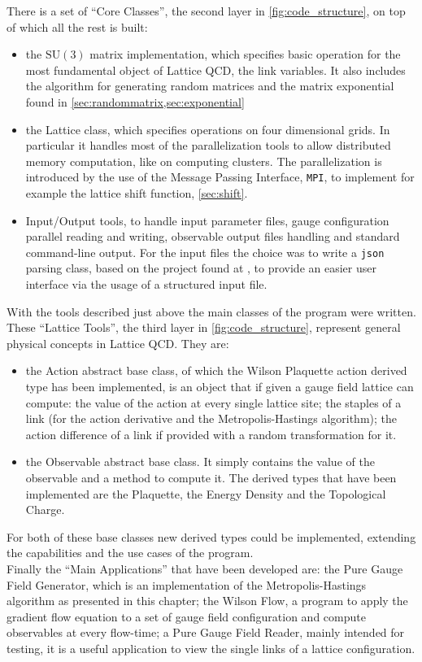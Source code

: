 
There is a set of ``Core Classes'', the second layer in \cref{fig:code_structure}, on top of which all the rest is built:
\begin{itemize} 
    \item the $\mathrm{SU}(3)$ matrix implementation, which specifies basic operation for the most fundamental object of Lattice QCD, the link variables. It also includes the algorithm for generating random matrices and the matrix exponential found in \cref{sec:randommatrix,sec:exponential} 
    \item the Lattice class, which specifies operations on four dimensional grids. In particular it handles most of the parallelization tools to allow distributed memory computation, like on computing clusters. The parallelization is introduced by the use of the Message Passing Interface, \texttt{MPI}, to implement for example the lattice shift function, \cref{sec:shift}.
    \item Input/Output tools, to handle input parameter files, gauge configuration parallel reading and writing, observable output files handling and standard command-line output. For the input files the choice was to write a \texttt{json} parsing class, based on the project found at \cite{_nlohmann/json}, to provide an easier user interface via the usage of a  structured input file.
\end{itemize}

With the tools described just above the main classes of the program were written. These ``Lattice Tools'', the third layer in \cref{fig:code_structure}, represent general physical concepts in Lattice QCD. They are:
\begin{itemize}
    \item the Action abstract base class, of which the Wilson Plaquette action derived type has been implemented, is an object that if given a gauge field lattice can compute: the value of the action at every single lattice site; the staples of a link (for the action derivative and the Metropolis-Hastings algorithm); the action difference of a link if provided with a random transformation for it.
    \item the Observable abstract base class. It simply contains the value of the observable and a method to compute it. The derived types that have been implemented are the Plaquette, the Energy Density and the Topological Charge.  
\end{itemize}
For both of these base classes new derived types could be implemented, extending the capabilities and the use cases of the program. \\
Finally the ``Main Applications'' that have been developed are: the Pure Gauge Field Generator, which is an implementation of the Metropolis-Hastings algorithm as presented in this chapter; the Wilson Flow, a program to apply the gradient flow equation to a set of gauge field configuration and compute observables at every flow-time; a Pure Gauge Field Reader, mainly intended for testing, it is a useful application to view the single links of a lattice configuration.